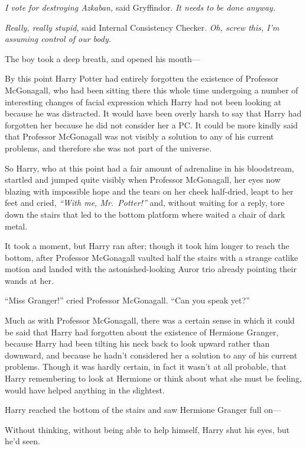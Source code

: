 \emph{I vote for destroying Azkaban,} said Gryffindor. \emph{It needs to
be done anyway.}

\emph{Really, really stupid,} said Internal Consistency Checker.
\emph{Oh, screw this, I'm assuming control of our body.}

The boy took a deep breath, and opened his mouth---

By this point Harry Potter had entirely forgotten the existence of
Professor McGonagall, who had been sitting there this whole time
undergoing a number of interesting changes of facial expression which
Harry had not been looking at because he was distracted. It would have
been overly harsh to say that Harry had forgotten her because he did not
consider her a PC. It could be more kindly said that Professor
McGonagall was not visibly a solution to any of his current problems,
and therefore she was not part of the universe.

So Harry, who at this point had a fair amount of adrenaline in his
bloodstream, startled and jumped quite visibly when Professor
McGonagall, her eyes now blazing with impossible hope and the tears on
her cheek half-dried, leapt to her feet and cried, \emph{``With me,
Mr.~Potter!''} and, without waiting for a reply, tore down the stairs
that led to the bottom platform where waited a chair of dark metal.

It took a moment, but Harry ran after; though it took him longer to
reach the bottom, after Professor McGonagall vaulted half the stairs
with a strange catlike motion and landed with the astonished-looking
Auror trio already pointing their wands at her.

``Miss Granger!'' cried Professor McGonagall. ``Can you speak yet?''

Much as with Professor McGonagall, there was a certain sense in which it
could be said that Harry had forgotten about the existence of Hermione
Granger, because Harry had been tilting his neck back to look upward
rather than downward, and because he hadn't considered her a solution to
any of his current problems. Though it was hardly certain, in fact it
wasn't at all probable, that Harry remembering to look at Hermione or
think about what she must be feeling, would have helped anything in the
slightest.

Harry reached the bottom of the stairs and saw Hermione Granger full
on---

Without thinking, without being able to help himself, Harry shut his
eyes, but he'd seen.

